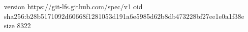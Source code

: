 version https://git-lfs.github.com/spec/v1
oid sha256:b28b5171092d60668f1281053d191a6e5985d62b8db473228bf27ee1e0a1f38e
size 8322
